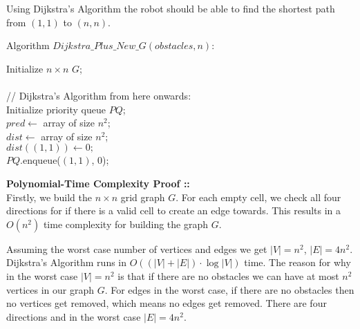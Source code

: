 \documentclass[11pt]{article}
\begin{document}
\begin{enumerate}[(a)]
Using Dijkstra's Algorithm the robot should be able to find the shortest path from
$(1,1)$ to $(n,n)$. \pagebreak

Algorithm $Dijkstra\_Plus\_New\_G(obstacles, n)$:
\begin{algorithm}
    Initialize $n\times n\,\, G$; \\
    \,\\
    // Dijkstra's Algorithm from here onwards:\\
    Initialize priority queue $PQ$; \\
    $pred\gets$ array of size $n^2$; \\
    $dist\gets$ array of size $n^2$; \\
    $dist((1, 1))\gets 0;$ \\
    $PQ$.enqueue($(1,1)$, 0); \\
\end{algorithm}
\pagebreak

\textbf{Polynomial-Time Complexity Proof ::} \\
Firstly, we build the $n\times n$ grid graph $G$. For each empty cell,
we check all four directions for if there is a valid cell to create an edge towards.
This results in a $O(n^2)$ time complexity for building the graph $G$.

Assuming the worst case number of vertices and edges we get $|V| = n^2$,
$|E| = 4 n^2$. Dijkstra's Algorithm runs in $O((|V| + |E|)\cdot \log |V|)$ time.
The reason for why in the worst case $|V| = n^2$ is that if there are no obstacles we
can have at most $n^2$ vertices in our graph $G$. For edges in the worst case, if there
are no obstacles then no vertices get removed, which means no edges get removed. There
are four directions and in the worst case $|E| = 4n^2$.


\end{enumerate}
\end{document}
